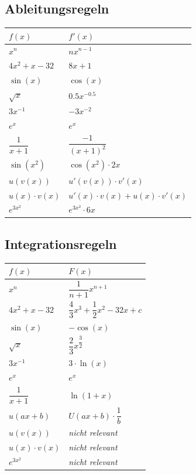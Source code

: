 \documentclass[a4paper, 15pt]{article}
\begin{document}
\begin{minipage}{.45\textwidth}
\subsection{Ableitungsregeln}
\renewcommand{\arraystretch}{2}
\begin{tabularx}{\columnwidth}{X|X}
$f(x)$&$f'(x)$ \\
\hline
$x^n$&$nx^{n-1}$\\
$4x^2+x-32$&$8x+1$ \\
$\sin(x)$&$\cos(x)$ \\
$\sqrt{x}$&$0.5x^{-0.5}$ \\
$3x^{-1}$&$-3x^{-2}$ \\
$e^x$&$e^x$ \\
$\dfrac{1}{x+1}$&$\dfrac{-1}{(x+1)^2}$ \\
$\sin(x^2)$&$\cos(x^2)\cdot2x$ \\
$u(v(x))$&$u'(v(x))\cdot v'(x)$ \\
$u(x)\cdot v(x)$&$u'(x)\cdot v(x)+u(x)\cdot v'(x)$ \\
$e^{3x^2}$&$e^{3x^2}\cdot 6x$ \\
\end{tabularx}
\end{minipage}
\hspace{1cm}
\begin{minipage}{.45\textwidth}
\subsection{Integrationsregeln}
\renewcommand{\arraystretch}{2}
\begin{tabularx}{\columnwidth}{X|X}
$f(x)$&$F(x)$ \\
\hline
$x^n$&$\dfrac{1}{n+1}x^{n+1}$\\
$4x^2+x-32$&$\dfrac{4}{3}x^{3}+\dfrac{1}{2}x^2-32x+c$ \\
$\sin(x)$&$-\cos(x)$ \\
$\sqrt{x}$&$\dfrac{2}{3}x^{\dfrac{3}{2}}$ \\
$3x^{-1}$&$3\cdot \ln(x)$ \\
$e^x$&$e^x$ \\
$\dfrac{1}{x+1}$&$\ln(1+x)$ \\
$u(ax+b)$&$U(ax+b)\cdot \dfrac{1}{b}$ \\
$u(v(x))$&\textit{nicht relevant} \\
$u(x)\cdot v(x)$&\textit{nicht relevant} \\
$e^{3x^2}$&\textit{nicht relevant} \\
\end{tabularx}
\end{minipage}
\end{document}
